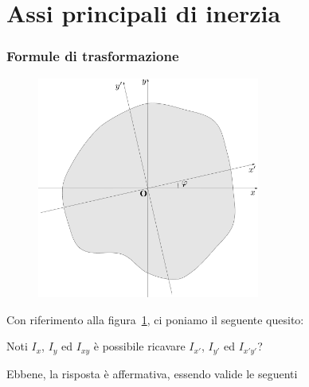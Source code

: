 \clearpage
\pagestyle{fancy}
\part{Assi principali di inerzia}
\setcounter{section}{0}
\section{Formule di trasformazione}
\renewcommand{\thefigure}{4~-~1}
\begin{figure}[ht]
\centering
\includegraphics[width=0.65\textwidth]{Immagini/Parte_4/Figura4_1/Figura4_1.pdf}
\caption{}
\label{figura4-1}
\end{figure}
\noindent Con riferimento alla figura~\ref{figura4-1}, ci poniamo il seguente quesito: 
\begin{quoting}
Noti $I_x$, $I_y$ ed $I_{xy}$ è possibile ricavare $I_{x'}$, $I_{y'}$ ed $I_{x'y'}$?
\end{quoting}
Ebbene, la risposta è affermativa, essendo valide le seguenti
